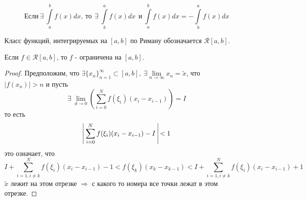 \begin{statement}
    \[\text{Если}\ \exists\ \int\limits_{a}^{b}f(x)dx,\ \text{то}\ \ \exists\ \int\limits_{b}^{a}f(x)dx\ \ \text{и}\ \int\limits_{a}^{b}f(x)dx=-\int\limits_{b}^{a}f(x)dx\]
\end{statement} 
\begin{definition}
    Класс функций, интегрируемых на $[a,b]$ по Риману обозначается $\mathcal{R}[a,b]$.
\end{definition} 
\begin{theorem}
    Если $f\in \mathcal{R}[a,b]$, то $f$ - ограничена на $[a,b]$.
\end{theorem} 
\begin{proof}
    Предположим, что $\exists \{x_n\}_{n=1}^{\infty}\subset [a,b],\ \exists \lim\limits_{n\to \infty}x_n=\widetilde{x}$, что\\
    $|f(x_n)|>n$ и пусть
    \[\exists\ \lim\limits_{d\to 0}\left( \sum\limits_{i=0}^{N}f(\xi_i)(x_i-x_{i-1}) \right)=I\] 
    то есть 
    \[\vline\ \sum\limits_{i=0}^{N}f(\xi_i)(x_i-x_{i-1})-I\ \vline<1\]
    это означает, что 
    \[I+\sum\limits_{i=1,i\ne k}^{N} f(\xi_i)(x_i-x_{i-1})-1<f(\xi_k)(x_k-x_{k-1})<I+\sum\limits_{i=1,i\ne k}^{N} f(\xi_i)(x_i-x_{i-1})+1\]
    $\widetilde{x}$ лежит на этом отрезке $\Rightarrow$ с какого то номера все точки лежат в этом отрезке.
\end{proof} 

